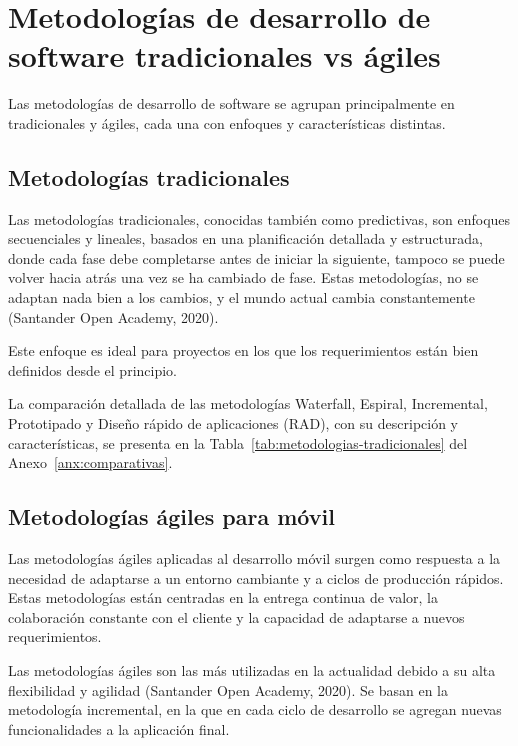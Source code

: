 \section{Metodologías de desarrollo de software tradicionales vs ágiles}
\label{sec:tradicionales-agiles}

Las metodologías de desarrollo de software se agrupan principalmente en
tradicionales y ágiles, cada una con enfoques y características distintas.

\subsection{Metodologías tradicionales}

Las metodologías tradicionales, conocidas también como predictivas, son
enfoques secuenciales y lineales, basados en una planificación detallada y
estructurada, donde cada fase debe completarse antes de iniciar la siguiente,
tampoco se puede volver hacia atrás una vez se ha cambiado de fase. Estas
metodologías, no se adaptan nada bien a los cambios, y el mundo actual cambia
constantemente (Santander Open Academy, 2020).

Este enfoque es ideal para proyectos en los que los requerimientos están bien
definidos desde el principio.

La comparación detallada de las metodologías Waterfall, Espiral, Incremental, Prototipado y Diseño rápido de aplicaciones (RAD), con su descripción y características, se presenta en la Tabla~\ref{tab:metodologias-tradicionales} del Anexo~\ref{anx:comparativas}.

\subsection{Metodologías ágiles para móvil}

Las metodologías ágiles aplicadas al desarrollo móvil surgen como respuesta a
la necesidad de adaptarse a un entorno cambiante y a ciclos de producción
rápidos. Estas metodologías están centradas en la entrega continua de valor, la
colaboración constante con el cliente y la capacidad de adaptarse a nuevos
requerimientos.

Las metodologías ágiles son las más utilizadas en la actualidad debido a su alta
flexibilidad y agilidad (Santander Open Academy, 2020). Se basan en la metodología
incremental, en la que en cada ciclo de desarrollo se agregan nuevas
funcionalidades a la aplicación final.

